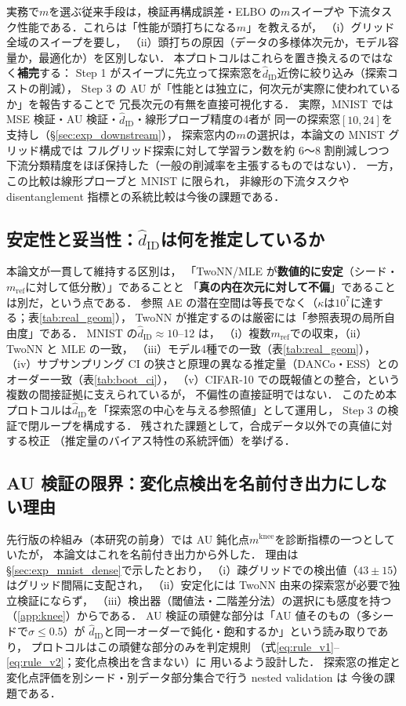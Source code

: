 \documentclass[11pt,a4paper]{jsarticle}
\newcommand{\hatdID}{\hat{d}_{\mathrm{ID}}}
\newcommand{\kap}{\kappa}
\newcommand{\mknee}{m^{\mathrm{knee}}}
\begin{document}
実務で$m$を選ぶ従来手段は，検証再構成誤差・ELBO の$m$スイープや
下流タスク性能である．これらは「性能が頭打ちになる$m$」を教えるが，
（i）グリッド全域のスイープを要し，
（ii）頭打ちの原因（データの多様体次元か，モデル容量か，最適化か）を区別しない．
本プロトコルはこれらを置き換えるのではなく\textbf{補完}する：
Step 1 がスイープに先立って探索窓を$\hatdID$近傍に絞り込み（探索コストの削減），
Step 3 の AU が「性能とは独立に，何次元が実際に使われているか」を報告することで
冗長次元の有無を直接可視化する．
実際，MNIST では MSE 検証・AU 検証・$\hatdID$・線形プローブ精度の4者が
同一の探索窓$[10, 24]$を支持し（§\ref{sec:exp_downstream}），
探索窓内の$m$の選択は，本論文の MNIST グリッド構成では
フルグリッド探索に対して学習ラン数を約 6〜8 割削減しつつ
下流分類精度をほぼ保持した（一般の削減率を主張するものではない）．
一方，この比較は線形プローブと MNIST に限られ，
非線形の下流タスクや disentanglement 指標との系統比較は今後の課題である．

\subsection{安定性と妥当性：$\hatdID$は何を推定しているか}\label{sec:disc_twonn}

本論文が一貫して維持する区別は，
「TwoNN/MLE が\textbf{数値的に安定}（シード・$m_{\mathrm{ref}}$に対して低分散）」であることと
「\textbf{真の内在次元に対して不偏}」であることは別だ，という点である．
参照 AE の潜在空間は等長でなく（$\kap$は$10^{7}$に達する；表\ref{tab:real_geom}），
TwoNN が推定するのは厳密には「参照表現の局所自由度」である．
MNIST の$\hatdID \approx 10$--12 は，
（i）複数$m_{\mathrm{ref}}$での収束，（ii）TwoNN と MLE の一致，
（iii）モデル4種での一致（表\ref{tab:real_geom}），
（iv）サブサンプリング CI の狭さと原理の異なる推定量（DANCo・ESS）との
オーダー一致（表\ref{tab:boot_ci}），
（v）CIFAR-10 での既報値との整合，という複数の間接証拠に支えられているが，
不偏性の直接証明ではない．
このため本プロトコルは$\hatdID$を「探索窓の中心を与える参照値」として運用し，
Step 3 の検証で閉ループを構成する．
残された課題として，合成データ以外での真値に対する校正
（推定量のバイアス特性の系統評価）を挙げる．

\subsection{AU 検証の限界：変化点検出を名前付き出力にしない理由}\label{sec:disc_knee}

先行版の枠組み（本研究の前身）では AU 鈍化点$\mknee$を診断指標の一つとしていたが，
本論文はこれを名前付き出力から外した．
理由は§\ref{sec:exp_mnist_dense}で示したとおり，
（i）疎グリッドでの検出値（$43 \pm 15$）はグリッド間隔に支配され，
（ii）安定化には TwoNN 由来の探索窓が必要で独立検証にならず，
（iii）検出器（閾値法・二階差分法）の選択にも感度を持つ（\ref{app:knee}）からである．
AU 検証の頑健な部分は「AU 値そのもの（多シードで$\sigma \leq 0.5$）が
$\hatdID$と同一オーダーで鈍化・飽和するか」という読み取りであり，
プロトコルはこの頑健な部分のみを判定規則
（式\eqref{eq:rule_v1}--\eqref{eq:rule_v2}；変化点検出を含まない）に
用いるよう設計した．
探索窓の推定と変化点評価を別シード・別データ部分集合で行う nested validation は
今後の課題である．
\end{document}
